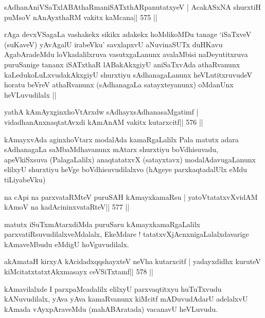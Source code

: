 \begin{shl}
sAdhanAniVSaTxlABAthaRmaniSATxthARpanutatxyeV |
AcakASxNA shurxtiH puMsoV nAnAyxthaRM vakitx kaMcana\hfill || 575 ||
\end{shl}

\begin{artha}
rAga devxVSagaLa vashakekx sikikx adakekx hoMdikoMDu tanage `iSaTxveV
(suKaveV) yAvAgalU irabeVku' savxlapxvU aNuvinaSUTx duHKavu
AgabAradeMdu loVkadalilxruva vasutxgaLanunx avalaMbisi naDeyutitxruva
puruSanige tananx iSATxthaR lABakAkxgiyU aniSaTxvAda athaRvanunx
kaLedukoLuLxvudakAkxgiyU shurxtiyu sAdhanagaLanunx heVLutitxruvudeV
horatu beVreV athaRvanunx (sAdhanagaLa satayxteyanunx) oMdanUnx
heVLuvudilalx ||
\end{artha}



\begin{shl}
yathA kAmAyxginxhoVtArxdw sAdhayxsAdhanasaMgatimf |
vidadhanAnxnaqtatAvxdi kAmAnAM vakitx kutarxcitf\hfill || 576 ||
\end{shl}

\begin{artha}
kAmayxvAda aginxhoVtarx modalAda kamaRgaLalilx Pala matutx adara
sAdhanagaLa saMbaMdhavanunx mAtarx shurxtiyu boVdhisuvadu,
apeVkiSxsuva (PalagaLalilx) anaqtatatxvX (satayxtavx) modalAdavugaLanunx
elilxyU shurxtiyu heVge boVdhisuvudilalxvo (hAgeye parxkaqtadalUlx
eMdu tiLiyabeVku)
\end{artha}

\begin{shl}
na cApi na parxvataRMteV puruSAH kAmayxkamaRsu |
yatoV\s tatatxvXvidAM kAmoV na kadAcininxvataRteV\hfill || 577 ||
\end{shl}

\begin{artha}
matutx iSuTxmAtarxdiMda puruSaru kAmayxkamaRgaLalilx parxvatiRsuvudilalxveMdalalx, EkeMdare ! tatatxvXjAcnxnigaLalalxdavarige kAmaveMbudu eMdigU hoVguvudilalx.
\end{artha}

\begin{shl}
akAmataH kirxyA kAcidadxqqshayxteV neVha kutarxcitf |
yadayxdidhx kuruteV kiMcitatxtatxtAkxmasayx ceVSiTxtamf\hfill || 578 ||
\end{shl}

\begin{artha}
kAmavilalxde I parxpaMcadalilx elilxyU parxvaqtitxyu huTuTxvudu
kANuvudilalx, yAva yAva kamaRvanunx kiMcitf mADuvudAdarU adelalxvU
kAmada vAyxpAraveMdu (mahABAratada) vacanavU heVLuvudu.
\end{artha}

